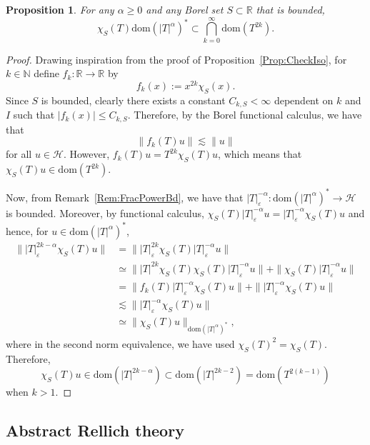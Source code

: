 \documentclass[a4paper,10pt,reqno]{amsart}
\newcommand{\R}{\mathbb{R}}
\newcommand{\N}{\mathbb{N}}
\newcommand{\modulus}[1]{|#1|}
\newcommand{\norm}[1]{\| #1 \|}%
\newcommand{\Hil}{\mathscr{H}}
\newcommand{\dom}{\mathrm{dom}}
\renewcommand{\epsilon}{\varepsilon}
\newtheorem{proposition}[theorem]{Proposition}
\theoremstyle{definition}
\begin{document}
\begin{proposition}
\label{Prop:IntSmoothAbstract}
For any $\alpha \ge 0$ and any Borel set $S \subset \R$ that is bounded,
$$\chi_{S}(T) \dom(\modulus{T}^{\alpha})^\ast  \subset \bigcap_{k=0}^\infty\dom(T^{2k}) .$$
\end{proposition}
\begin{proof}
Drawing inspiration from the proof of Proposition~\ref{Prop:CheckIso}, for $k \in \N$ define $f_k: \R\to \R$ by
$$ f_k(x) := x^{2k} \chi_{S}(x).$$
Since $S$ is bounded, clearly there exists a constant $C_{k,S} < \infty$ dependent  on $k$ and $I$ such that $\modulus{f_k(x)}  \leq C_{k,S}$.
Therefore, by the Borel functional calculus, we have that
$$ \norm{f_k(T)u} \lesssim \norm{u}$$
for all $u \in \Hil$.
However, $f_k(T)u = T^{2k} \chi_{S}(T)u$, which means that $\chi_{S}(T)u \in \dom(T^{2k})$.

Now, from Remark~\ref{Rem:FracPowerBd}, we have that $\modulus{T}^{-\alpha}_\epsilon: \dom(\modulus{T}^\alpha)^\ast \to \Hil$ is bounded.
Moreover, by functional calculus, $\chi_{S}(T) \modulus{T}^{-\alpha}_{\epsilon}u =  \modulus{T}^{-\alpha}_{\epsilon} \chi_{S}(T) u$ and hence, for $u \in \dom(\modulus{T}^\alpha)^\ast$,
\begin{align*}
\norm{\modulus{T}^{2k-\alpha}_\epsilon \chi_{S}(T) u}
 & = \norm{\modulus{T}^{2k}_\epsilon \chi_{S}(T) \modulus{T}^{-\alpha}_\epsilon u }                                                                \\
 & \simeq \norm{\modulus{T}^{2k} \chi_{S}(T) \chi_{S}(T) \modulus{T}^{-\alpha}_\epsilon u} + \norm{  \chi_{S}(T) \modulus{T}^{-\alpha}_\epsilon u} \\
 & = \norm{f_k(T)\modulus{T}^{-\alpha}_\epsilon \chi_{S}(T) u} + \norm{ \modulus{T}^{-\alpha}_\epsilon \chi_{S}(T) u}                              \\
 & \lesssim \norm{ \modulus{T}^{-\alpha}_\epsilon \chi_{S}(T) u}                                                                                   \\
 & \simeq \norm{\chi_{S}(T)u}_{\dom(\modulus{T}^\alpha)^\ast},
\end{align*}
where in the second norm equivalence, we have used $\chi_{S}(T)^2 = \chi_{S}(T)$.
Therefore,
$$\chi_{S}(T)u \in \dom(\modulus{T}^{2k-\alpha}) \subset   \dom(\modulus{T}^{2k-2}) = \dom(T^{2(k-1)})$$
when $k > 1$.
\end{proof}


\subsection{Abstract Rellich theory}
\end{document}
